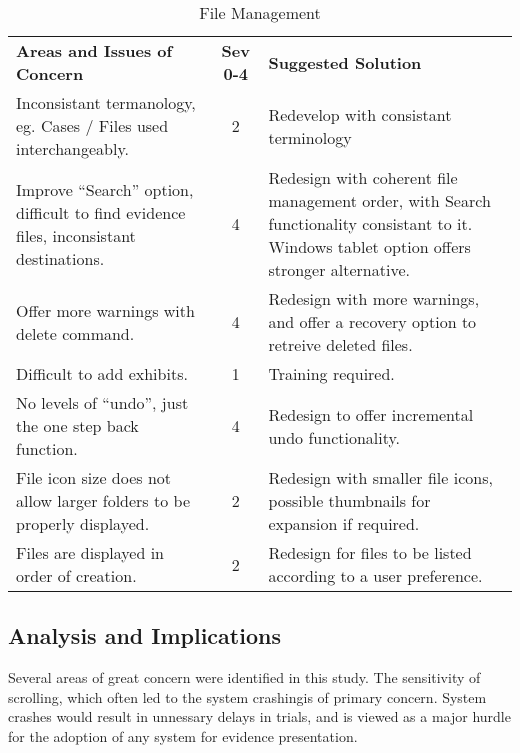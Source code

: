 \begin{center}
\begin{table}[htbp]
\label{tab:Issues_File_Management}
  \centering
  \caption{File Management}
    \begin{tabular}{|p{}|c|p{}|}
    \hline
    \rowcolor{lightgrey}\multicolumn{3}{|l|}{File Management} \\
    \hline
    \textbf{Areas and Issues of Concern} & \textbf{Sev 0-4} & \textbf{Suggested Solution}\\
    \hline
    Inconsistant termanology, eg. Cases / Files used interchangeably. & 2 & Redevelop with consistant terminology\\
    \hline
    Improve ``Search'' option, difficult to find evidence files, inconsistant destinations. & 4 & Redesign with coherent file management order, with Search functionality consistant to it. Windows tablet option offers stronger alternative.\\
    \hline
    Offer more warnings with delete command. & 4 & Redesign with more warnings, and offer a recovery option to retreive deleted files.\\
   \hline
   Difficult to add exhibits. & 1 & Training required.\\
   \hline
   No levels of ``undo'', just the one step back function. & 4 & Redesign to offer incremental undo functionality.\\
   \hline
   File icon size does not allow larger folders to be properly displayed. & 2 & Redesign with smaller file icons, possible thumbnails for expansion if required.\\
   \hline
   Files are displayed in order of creation. & 2 & Redesign for files to be listed according to a user preference.\\
   \hline
   
\end{tabular}
\end{table}
\end{center}
\subsection{Analysis and Implications}
Several areas of great concern were identified in this study. The sensitivity of scrolling, which often led to the system crashingis of primary concern. System crashes would result in unnessary delays in trials, and is viewed as a major hurdle for the adoption of any system for evidence presentation.

